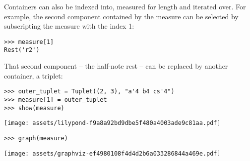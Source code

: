 \noindent Containers can also be indexed into, measured for length and iterated
over. For example, the second component contained by the measure can be
selected by subscripting the measure with the index 1:

\begin{comment}
<abjad>
measure[1]
</abjad>
\end{comment}

\begin{abjadbookoutput}
\begin{singlespacing}
\vspace{-0.5\baselineskip}
\begin{verbatim}
>>> measure[1]
Rest('r2')
\end{verbatim}
\end{singlespacing}
\end{abjadbookoutput}

\noindent That second component -- the half-note rest -- can be replaced by
another container, a triplet:

\begin{comment}
<abjad>
outer_tuplet = Tuplet((2, 3), "a'4 b4 cs'4")
measure[1] = outer_tuplet
show(measure)
</abjad>
\end{comment}

\begin{abjadbookoutput}
\begin{singlespacing}
\vspace{-0.5\baselineskip}
\begin{verbatim}
>>> outer_tuplet = Tuplet((2, 3), "a'4 b4 cs'4")
>>> measure[1] = outer_tuplet
>>> show(measure)
\end{verbatim}
\noindent\texttt{[image: assets/lilypond-f9a8a92bd9dbe5f480a4003ade9c81aa.pdf]}
\end{singlespacing}
\end{abjadbookoutput}

\begin{comment}
<abjad>
graph(measure)
</abjad>
\end{comment}

\begin{abjadbookoutput}
\begin{singlespacing}
\vspace{-0.5\baselineskip}
\begin{verbatim}
>>> graph(measure)
\end{verbatim}
\noindent\texttt{[image: assets/graphviz-ef4980108f4d4d2b6a033286844a469e.pdf]}
\end{singlespacing}
\end{abjadbookoutput}

